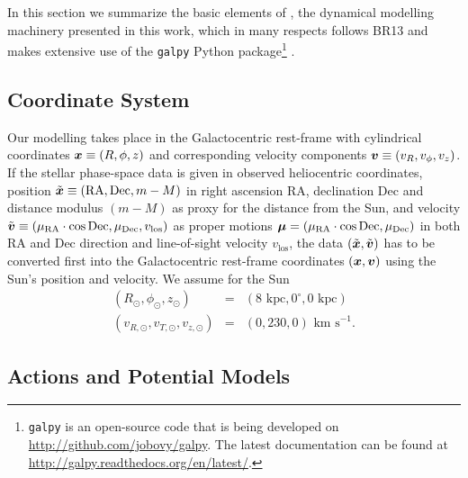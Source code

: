 

In this section we summarize the basic elements of \RM{}, the dynamical modelling machinery presented in this work, which in many respects follows BR13 and makes extensive use of the \texttt{galpy} Python package\footnote{\texttt{galpy} is an open-source code that is being developed on \url{http://github.com/jobovy/galpy}. The latest documentation can be found at \url{http://galpy.readthedocs.org/en/latest/}.} \citep{2015ApJS..216...29B}.

\subsection{Coordinate System} \label{sec:coordinates}

Our modelling takes place in the Galactocentric rest-frame with cylindrical coordinates $\boldsymbol{x} \equiv (R,\phi,z)$ and corresponding velocity components $\boldsymbol{v} \equiv (v_R,v_\phi,v_z)$. If the stellar phase-space data is given in observed heliocentric coordinates, position $\tilde{\boldsymbol{x}} \equiv(\text{RA},\text{Dec},m-M)$ in right ascension RA, declination Dec and distance modulus $(m-M)$ as proxy for the distance from the Sun, and velocity $\tilde{\boldsymbol{v}} \equiv (\mu_\text{RA} \cdot \cos \text{Dec},\mu_\text{Dec},v_\text{los})$ as proper motions $\boldsymbol{\mu}=(\mu_\text{RA} \cdot \cos \text{Dec},\mu_\text{Dec})$ in both RA and Dec direction and line-of-sight velocity $v_\text{los}$, the data $(\tilde{\boldsymbol{x}},\tilde{\boldsymbol{v}})$ has to be converted first into the Galactocentric rest-frame coordinates $(\boldsymbol{x},\boldsymbol{v})$ using the Sun's position and velocity. We assume for the Sun
\begin{eqnarray*}
(R_\odot,\phi_\odot,z_\odot) &=&(8 \text{ kpc}, 0^\circ, 0 \text{ kpc})\\
(v_{R,\odot},v_{T,\odot},v_{z,\odot}) &=& (0,230,0) \text{ km s}^{-1}.
\end{eqnarray*}

\subsection{Actions and Potential Models}  \label{sec:potentials}

